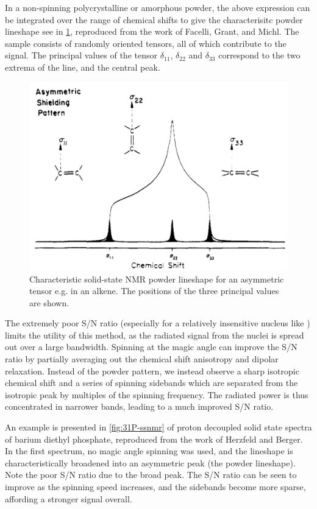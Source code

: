 \begin{refsection}
In a non-spinning polycrystalline or amorphous powder, the above expression can be integrated over the range of chemical shifts to give the characterisitc powder lineshape see in \cref{fig:ssnmr-tensor}, reproduced from the work of Facelli, Grant, and Michl.\autocite{Facelli1987Carbon-13Determination}
The sample consists of randomly oriented tensors, all of which contribute to the signal.
The principal values of the tensor $\delta_{11}$, $\delta_{22}$ and $\delta_{33}$ correspond to the two extrema of the line, and the central peak.

\begin{figure}
  \centering
  \includegraphics[width=0.45\linewidth]{Figures/ssnmr-tensor.pdf}
  \caption{Characteristic solid-state NMR powder lineshape for an asymmetric tensor e.g. in an alkene. The positions of the three principal values are shown.}
  \label{fig:ssnmr-tensor}
\end{figure}

The extremely poor S/N ratio (especially for a relatively insensitive nucleus like ) limits the utility of this method, as the radiated signal from the nuclei is spread out over a large bandwidth.
Spinning at the magic angle can improve the S/N ratio by partially averaging out the chemical shift anisotropy and dipolar relaxation.
Instead of the powder pattern, we instead observe a sharp isotropic chemical shift and a series of spinning sidebands which are separated from the isotropic peak by multiples of the spinning frequency.
The radiated power is thus concentrated in narrower bands, leading to a much improved S/N ratio.

An example is presented in \cref{fig:31P-ssnmr} of proton decoupled solid state  spectra of barium diethyl phosphate, reproduced from the work of Herzfeld and Berger\autocite{Herzfeld1980SidebandAngle}.
In the first spectrum, no magic angle spinning was used, and the lineshape is characteristically broadened into an asymmetric peak (the powder lineshape).
Note the poor S/N ratio due to the broad peak.
The S/N ratio can be seen to improve as the spinning speed increases, and the sidebands become more sparse, affording a stronger signal overall.


\end{refsection}
